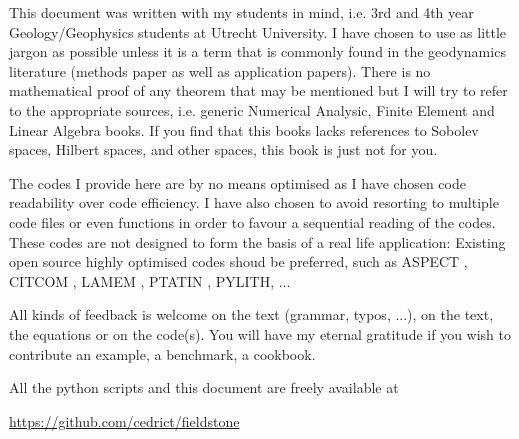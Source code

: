 
This document was written with my students in mind, i.e. 3rd and 4th year 
Geology/Geophysics students at Utrecht University. 
I have chosen to use as little jargon as possible unless it is a term that is 
commonly found in the geodynamics literature (methods paper as well as 
application papers). There is no mathematical proof of any theorem that may 
be mentioned but I will try to refer to the appropriate sources, i.e.
generic Numerical Analysic, Finite Element and 
Linear Algebra books. If you find that this books lacks references
to Sobolev spaces, Hilbert spaces, and other spaces, this book is just not for you.  

The codes I provide here are by no means optimised as I have chosen code readability 
over code efficiency. I have also chosen to avoid resorting to multiple code 
files or even functions in order to favour a sequential reading of the codes. 
These codes are not designed to form the basis of a real life application:
Existing open source highly optimised codes shoud be preferred, such as 
ASPECT \cite{krhb12,hedg17}, CITCOM \cite{zhzm00,zhmt08}, LAMEM \cite{kapb16}, 
PTATIN \cite{mabl14,mabl15}, PYLITH, ... 

All kinds of feedback is welcome on the text (grammar, typos, ...), on the text, the equations
or on the code(s). You will have my eternal gratitude if you wish to contribute an 
example, a benchmark, a cookbook. 

All the python scripts and this document are freely available at 
\begin{center}
\url{https://github.com/cedrict/fieldstone}
\end{center}

